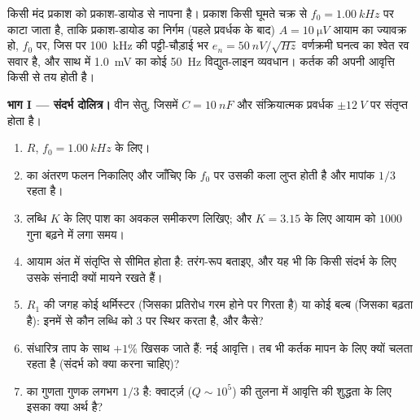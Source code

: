\begin{problem}[{सप्ताहांत समस्या --- संदर्भ दोलित्र से अंकीकृत परिणाम
तक: एक मिलीवोल्ट रव के नीचे दबे दस माइक्रोवोल्ट के प्रकाश-संकेत को
नापना}]
\label{pb:b2:feedback-oscillators:1}

किसी मंद प्रकाश को प्रकाश-डायोड से नापना है। प्रकाश किसी घूमते चक्र से
$f_0 = \qty{1.00}{kHz}$ पर काटा जाता है, ताकि प्रकाश-डायोड का
निर्गम (पहले प्रवर्धक के बाद) $A = \qty{10}{\micro V}$ आयाम का ज्यावक्र हो, $f_0$ पर,
जिस पर \qty{100}{kHz} की पट्टी-चौड़ाई भर $e_n = \qty{50}{nV/\sqrt{Hz}}$ वर्णक्रमी
घनत्व का श्वेत रव सवार है, और साथ में \qty{1.0}{mV} का कोई
\qty{50}{Hz} विद्युत-लाइन व्यवधान। कर्तक की अपनी आवृत्ति
किसी  से तय होती है।

\medskip
\noindent\textbf{भाग I --- संदर्भ दोलित्र।}
वीन सेतु, जिसमें $C = \qty{10}{nF}$ और संक्रियात्मक प्रवर्धक $\pm\qty{12}{V}$ पर संतृप्त होता है।
\begin{enumerate}
  \item $R$, $f_0 = \qty{1.00}{kHz}$ के लिए।
  \item {} का अंतरण फलन निकालिए और जाँचिए
        कि $f_0$ पर उसकी कला लुप्त होती है और मापांक $1/3$ रहता है।
  \item लब्धि $K$ के लिए पाश का अवकल समीकरण लिखिए; और
        $K = 3.15$ के लिए आयाम को $1000$ गुना बढ़ने में लगा समय।
  \item आयाम अंत में संतृप्ति से सीमित होता है: तरंग-रूप बताइए, और
        यह भी कि किसी संदर्भ के लिए उसके संनादी क्यों मायने रखते हैं।
  \item $R_1$ की जगह कोई थर्मिस्टर (जिसका प्रतिरोध गरम होने पर गिरता है)
        या कोई बल्ब (जिसका बढ़ता है): इनमें से कौन लब्धि को 3 पर स्थिर करता है,
        और कैसे?
  \item संधारित्र ताप के साथ $+1\%$ खिसक जाते हैं: नई आवृत्ति।
        तब भी कर्तक मापन के लिए क्यों चलता रहता है (संदर्भ को क्या
        करना चाहिए)?
  \item {} का गुणता गुणक लगभग $1/3$ है: क्वार्ट्ज़
        ($Q \sim 10^5$) की तुलना में आवृत्ति की शुद्धता के लिए इसका
        क्या अर्थ है?
\end{enumerate}


\end{problem}
